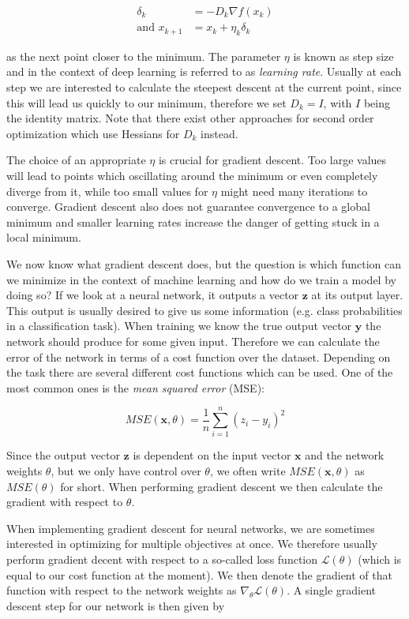 \begin{align*}
  \delta_k &= -D_k \nabla f(x_k) \\
  \text{and } x_{k+1} &= x_k + \eta_k \delta_k
\end{align*}

as the next point closer to the minimum. The parameter $\eta$ is known as step size and in the context of deep learning is referred to as \textit{learning rate}. Usually at each step we are interested to calculate the steepest descent at the current point, since this will lead us quickly to our minimum, therefore we set $D_k = I$, with $I$ being the identity matrix. Note that there exist other approaches for second order optimization which use Hessians for $D_k$ instead.

The choice of an appropriate $\eta$ is crucial for gradient descent. Too large values will lead to points which oscillating around the minimum or even completely diverge from it, while too small values for $\eta$ might need many iterations to converge. Gradient descent also does not guarantee convergence to a global minimum and smaller learning rates increase the danger of getting stuck in a local minimum.

We now know what gradient descent does, but the question is which function can we minimize in the context of machine learning and how do we train a model by doing so? If we look at a neural network, it outputs a vector $\mathbf{z}$ at its output layer. This output is usually desired to give us some information (e.g. class probabilities in a classification task). When training we know the true output vector $\mathbf{y}$ the network should produce for some given input. Therefore we can calculate the error of the network in terms of a cost function over the dataset. Depending on the task there are several different cost functions which can be used. One of the most common ones is the \textit{mean squared error} (MSE):

\begin{equation*}
  MSE(\mathbf{x}, \theta) = \frac{1}{n} \sum^n_{i=1} (z_i - y_i)^2
\end{equation*}

Since the output vector $\mathbf{z}$ is dependent on the input vector $\mathbf{x}$ and the network weights $\theta$, but we only have control over $\theta$, we often write $MSE(\mathbf{x}, \theta)$ as $MSE(\theta)$ for short. When performing gradient descent we then calculate the gradient with respect to $\theta$. 

When implementing gradient descent for neural networks, we are sometimes interested in optimizing for multiple objectives at once. We therefore usually perform gradient decent with respect to a so-called loss function $\mathcal{L}(\theta)$ (which is equal to our cost function at the moment). We then denote the gradient of that function with respect to the network weights as $\nabla_\theta \mathcal{L}(\theta)$. A single gradient descent step for our network is then given by

